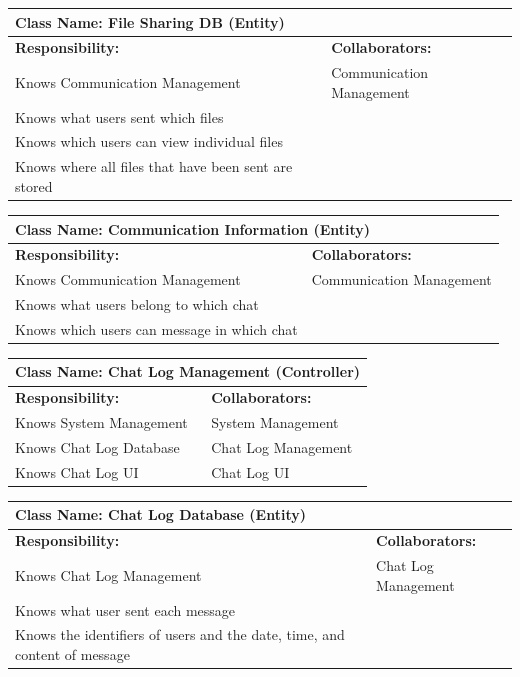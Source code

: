 \documentclass[]{article}
\begin{document}
	\begin{table}[ht]
		\centering
		\begin{tabular}{|p{7cm}|p{7cm}|}
		\hline 
			\multicolumn{2}{|l|}{\textbf{Class Name:} File Sharing DB (Entity)} \\
		\hline
		\textbf{Responsibility:} & \textbf{Collaborators:} \\
		\hline
		Knows Communication Management & Communication Management\\
		Knows what users sent which files & \\
		Knows which users can view individual files & \\
		Knows where all files that have been sent are stored & \\
		\hline
		\end{tabular}
	\end{table}

	\begin{table}[ht]
		\centering
		\begin{tabular}{|p{7cm}|p{7cm}|}
		\hline 
			\multicolumn{2}{|l|}{\textbf{Class Name:} Communication Information (Entity)} \\
		\hline
		\textbf{Responsibility:} & \textbf{Collaborators:} \\
		\hline
		Knows Communication Management & Communication Management\\
		Knows what users belong to which chat & \\
		Knows which users can message in which chat & \\
		\hline
		\end{tabular}
	\end{table}

	\begin{table}[ht]
		\centering
		\begin{tabular}{|p{7cm}|p{7cm}|}
		\hline 
			\multicolumn{2}{|l|}{\textbf{Class Name:} Chat Log Management (Controller)} \\
		\hline
		\textbf{Responsibility:} & \textbf{Collaborators:} \\
		\hline
		Knows System Management & System Management\\
		Knows Chat Log Database & Chat Log Management\\
		Knows Chat Log UI & Chat Log UI\\
		\hline
		\end{tabular}
	\end{table}

	\begin{table}[ht]
		\centering
		\begin{tabular}{|p{7cm}|p{7cm}|}
		\hline 
			\multicolumn{2}{|l|}{\textbf{Class Name:} Chat Log Database (Entity)} \\
		\hline
		\textbf{Responsibility:} & \textbf{Collaborators:} \\
		\hline
		Knows Chat Log Management & Chat Log Management\\
		Knows what user sent each message & \\
		Knows the identifiers of users and the date, time, and content of message & \\
		\hline
		\end{tabular}
	\end{table}
\end{document}
